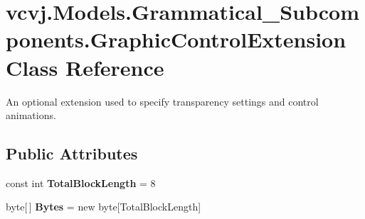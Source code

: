 \hypertarget{classvcvj_1_1_models_1_1_grammatical___subcomponents_1_1_graphic_control_extension}{}\section{vcvj.\+Models.\+Grammatical\+\_\+\+Subcomponents.\+Graphic\+Control\+Extension Class Reference}
\label{classvcvj_1_1_models_1_1_grammatical___subcomponents_1_1_graphic_control_extension}


An optional extension used to specify transparency settings and control animations.  


\subsection*{Public Attributes}
\begin{DoxyCompactItemize}
\item 
const int {\bfseries Total\+Block\+Length} = 8\hypertarget{classvcvj_1_1_models_1_1_grammatical___subcomponents_1_1_graphic_control_extension_a37b1009039c425e1153e67b7150d8072}{}\label{classvcvj_1_1_models_1_1_grammatical___subcomponents_1_1_graphic_control_extension_a37b1009039c425e1153e67b7150d8072}

\item 
byte\mbox{[}$\,$\mbox{]} {\bfseries Bytes} = new byte\mbox{[}Total\+Block\+Length\mbox{]}\hypertarget{classvcvj_1_1_models_1_1_grammatical___subcomponents_1_1_graphic_control_extension_a62037e4aa2974b83de3d3981af827ccc}{}\label{classvcvj_1_1_models_1_1_grammatical___subcomponents_1_1_graphic_control_extension_a62037e4aa2974b83de3d3981af827ccc}

\end{DoxyCompactItemize}
